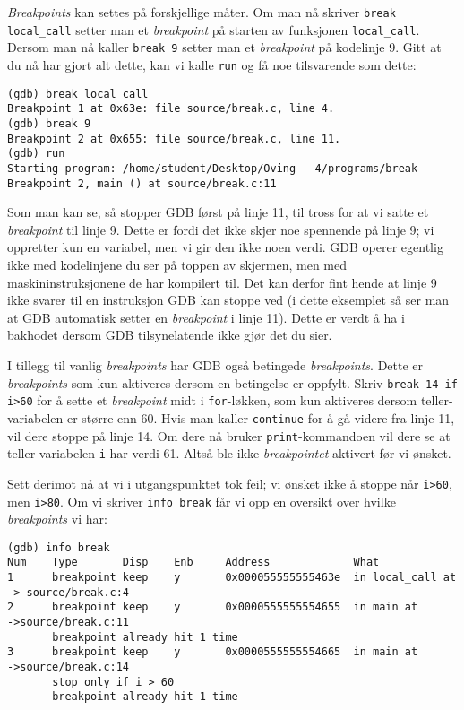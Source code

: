 \textit{Breakpoints} kan settes på forskjellige måter. Om man nå skriver \verb|break local_call| setter man et \textit{breakpoint} på starten av funksjonen \verb|local_call|. Dersom man nå kaller \verb|break 9| setter man et \textit{breakpoint} på kodelinje 9. Gitt at du nå har gjort alt dette, kan vi kalle \verb|run| og få noe tilsvarende som dette:

\begin{lstlisting}[mathescape=true,keywordstyle=\color{black}]
(gdb) break local_call
Breakpoint 1 at 0x63e: file source/break.c, line 4.
(gdb) break 9
Breakpoint 2 at 0x655: file source/break.c, line 11.
(gdb) run
Starting program: /home/student/Desktop/Oving - 4/programs/break
Breakpoint 2, main () at source/break.c:11
\end{lstlisting}


Som man kan se, så stopper GDB først på linje 11, til tross for at vi satte et \textit{breakpoint} til linje 9. Dette er fordi det ikke skjer noe spennende på linje 9; vi oppretter kun en variabel, men vi gir den ikke noen verdi. GDB operer egentlig ikke med kodelinjene du ser på toppen av skjermen, men med maskininstruksjonene de har kompilert til. Det kan derfor fint hende at linje 9 ikke svarer til en instruksjon GDB kan stoppe ved (i dette eksemplet så ser man at GDB automatisk setter en \textit{breakpoint} i linje 11). Dette er verdt å ha i bakhodet dersom GDB tilsynelatende ikke gjør det du sier.

I tillegg til vanlig \textit{breakpoints} har GDB også betingede \textit{breakpoints}. Dette er \textit{breakpoints} som kun aktiveres dersom en betingelse er oppfylt. Skriv \verb|break 14 if| \verb|i>60| for å sette et \textit{breakpoint} midt i \verb|for|-løkken, som kun aktiveres dersom teller-variabelen er større enn 60. Hvis man kaller \verb|continue| for å gå videre fra linje 11, vil dere stoppe på linje 14. Om dere nå bruker \verb|print|-kommandoen vil dere se at teller-variabelen \verb|i| har verdi 61. Altså ble ikke \textit{breakpointet} aktivert før vi ønsket.

Sett derimot nå at vi i utgangspunktet tok feil; vi ønsket ikke å stoppe når \verb|i>60|, men \verb|i>80|. Om vi skriver \verb|info break| får vi opp en oversikt over hvilke \textit{breakpoints} vi har:

\begin{lstlisting}[mathescape=true,keywordstyle=\color{black}]
(gdb) info break
Num    Type       Disp    Enb     Address             What
1      breakpoint keep    y       0x000055555555463e  in local_call at
-> source/break.c:4
2      breakpoint keep    y       0x0000555555554655  in main at
->source/break.c:11
       breakpoint already hit 1 time
3      breakpoint keep    y       0x0000555555554665  in main at
->source/break.c:14
       stop only if i > 60
       breakpoint already hit 1 time
\end{lstlisting}

